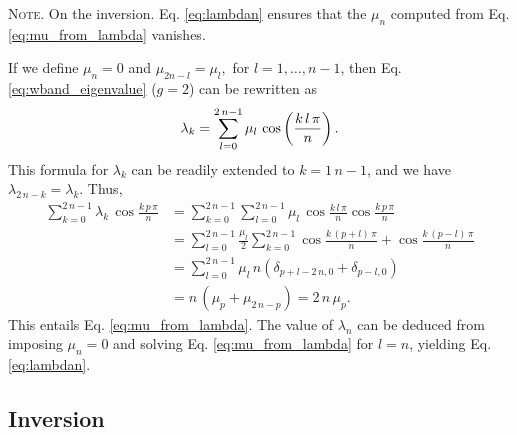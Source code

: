 \documentclass[reprint, superscriptaddress, floatfix]{revtex4-1}
\newcommand{\note}[1]{{\color{DarkGreen}\footnotesize \textsc{Note.} #1}}
\begin{document}
\note{On the inversion.
Eq. \eqref{eq:lambdan}
  ensures that the $\mu_n$
  computed from Eq. \eqref{eq:mu_from_lambda}
  vanishes.

  If we define $\mu_n = 0$ and
  $
    \mu_{ 2 n - l } = \mu_l,
  $
  for
  $l = 1, \dots, n - 1$,
  then Eq. \eqref{eq:wband_eigenvalue} ($g = 2$)
  can be rewritten as
  \begin{align}
    \lambda_k
    =
    \sum_{ l = 0 }^{ 2 \, n - 1 }
    \mu_l \, \cos \left(\frac{ k \, l \, \pi } { n } \right).
  \notag
  \end{align}
  This formula for $\lambda_k$
  can be readily extended to $k = 1 \, n - 1$,
  and we have
  $
    \lambda_{ 2 \, n - k } = \lambda_k
    .
  $
  Thus,
  $$
  \begin{aligned}
    \sum_{ k = 0 }^{ 2 \, n - 1 }
      \lambda_k \,
      \cos \frac{ k \, p \, \pi }
                {      n        }
    &=
    \sum_{ k = 0 }^{ 2 \, n - 1 }
      \sum_{ l = 0 }^{ 2 \, n - 1 }
        \mu_l \,
        \cos \frac{ k \, l \, \pi }
                  {      n        }
        \cos \frac{ k \, p \, \pi }
                  {      n        }
    \\
    &=
    \sum_{ l = 0 }^{ 2 \, n - 1 }
      \frac{ \mu_l } { 2 }
      \sum_{ k = 0 }^{ 2 \, n - 1 }
        \cos \frac{ k \, (p + l) \, \pi }
                  {      n        }
                  +
        \cos \frac{ k \, (p - l) \, \pi }
                  {      n        }
    \\
    &=
    \sum_{ l = 0 }^{ 2 \, n - 1 }
      \mu_l \, n \left(
        \delta_{ p + l - 2 \, n, 0 }
        +
        \delta_{ p - l, 0 }
      \right)
    \\
    &=
    n \, \left( \mu_p + \mu_{ 2 \, n - p} \right)
    =
    2 \, n \, \mu_p.
  \end{aligned}
  $$
  This entails Eq. \eqref{eq:mu_from_lambda}.
  The value of $\lambda_n$
  can be deduced from
  imposing $\mu_n = 0$
  and solving Eq. \eqref{eq:mu_from_lambda}
  for $l = n$,
  yielding Eq. \eqref{eq:lambdan}.
}


\subsection{\label{sec:invert_wband}
Inversion}
\end{document}
